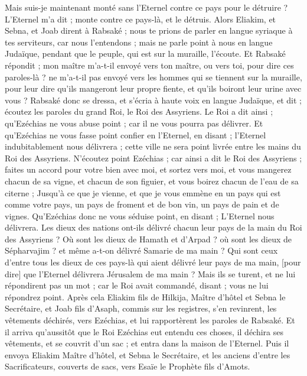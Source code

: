 \begin{multicols}{2}
Mais suis-je maintenant monté sans l'Eternel contre ce pays pour le détruire ? L'Eternel m'a dit ; monte contre ce pays-là, et le détruis.
Alors Eliakim, et Sebna, et Joab dirent à Rabsaké ; nous te prions de parler en langue syriaque à tes serviteurs, car nous l'entendons ; mais ne parle point à nous en langue Judaïque, pendant que le peuple, qui est sur la muraille, l'écoute.
Et Rabsaké répondit ; mon maître m'a-t-il envoyé vers ton maître, ou vers toi, pour dire ces paroles-là ? ne m'a-t-il pas envoyé vers les hommes qui se tiennent sur la muraille, pour leur dire qu'ils mangeront leur propre fiente, et qu'ils boiront leur urine avec vous ?
Rabsaké donc se dressa, et s'écria à haute voix en langue Judaïque, et dit ; écoutez les paroles du grand Roi, le Roi des Assyriens.
Le Roi a dit ainsi ; qu'Ezéchias ne vous abuse point ; car il ne vous pourra pas délivrer.
Et qu'Ezéchias ne vous fasse point confier en l'Eternel, en disant ; l'Eternel indubitablement nous délivrera ; cette ville ne sera point livrée entre les mains du Roi des Assyriens.
N'écoutez point Ezéchias ; car ainsi a dit le Roi des Assyriens ; faites un accord pour votre bien avec moi, et sortez vers moi, et vous mangerez chacun de sa vigne, et chacun de son figuier, et vous boirez chacun de l'eau de sa citerne ;
Jusqu'à ce que je vienne, et que je vous emmène en un pays qui est comme votre pays, un pays de froment et de bon vin, un pays de pain et de vignes.
Qu'Ezéchias donc ne vous séduise point, en disant ; L'Eternel nous délivrera. Les dieux des nations ont-ils délivré chacun leur pays de la main du Roi des Assyriens ?
Où sont les dieux de Hamath et d'Arpad ? où sont les dieux de Sépharvajim ? et même a-t-on délivré Samarie de ma main ?
Qui sont ceux d'entre tous les dieux de ces pays-là qui aient délivré leur pays de ma main, [pour dire] que l'Eternel délivrera Jérusalem de ma main ?
Mais ils se turent, et ne lui répondirent pas un mot ; car le Roi avait commandé, disant ; vous ne lui répondrez point.
Après cela Eliakim fils de Hilkija, Maître d'hôtel et Sebna le Secrétaire, et Joab fils d'Asaph, commis sur les registres, s'en revinrent, les vêtements déchirés, vers Ezéchias, et lui rapportèrent les paroles de Rabsaké.
\VerseOne{}Et il arriva qu'aussitôt que le Roi Ezéchias eut entendu ces choses, il déchira ses vêtements, et se couvrit d'un sac ; et entra dans la maison de l'Eternel.
Puis il envoya Eliakim Maître d'hôtel, et Sebna le Secrétaire, et les anciens d'entre les Sacrificateurs, couverts de sacs, vers Esaïe le Prophète fils d'Amots.

\end{multicols}
